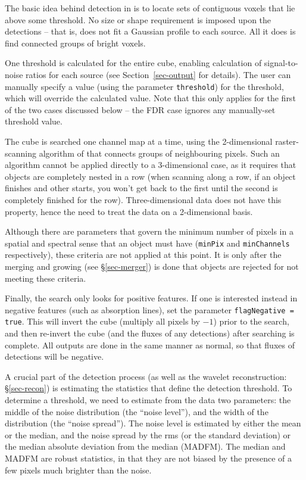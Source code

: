 \label{sec-detection}


The basic idea behind detection in \duchamp is to locate sets of
contiguous voxels that lie above some threshold. No size or shape
requirement is imposed upon the detections -- that is, \duchamp does
not fit \eg a Gaussian profile to each source. All it does is find
connected groups of bright voxels.

One threshold is calculated for the entire cube, enabling calculation
of signal-to-noise ratios for each source (see
Section~\ref{sec-output} for details). The user can manually specify a
value (using the parameter \texttt{threshold}) for the threshold,
which will override the calculated value. Note that this only applies
for the first of the two cases discussed below -- the FDR case ignores
any manually-set threshold value.

The cube is searched one channel map at a time, using the
2-dimensional raster-scanning algorithm of \citet{lutz80} that
connects groups of neighbouring pixels. Such an algorithm cannot be
applied directly to a 3-dimensional case, as it requires that objects
are completely nested in a row (when scanning along a row, if an
object finishes and other starts, you won't get back to the first
until the second is completely finished for the
row). Three-dimensional data does not have this property, hence the
need to treat the data on a 2-dimensional basis.

Although there are parameters that govern the minimum number of pixels
in a spatial and spectral sense that an object must have
(\texttt{minPix} and \texttt{minChannels} respectively), these
criteria are not applied at this point. It is only after the merging
and growing (see \S\ref{sec-merger}) is done that objects are rejected
for not meeting these criteria.

Finally, the search only looks for positive features. If one is
interested instead in negative features (such as absorption lines),
set the parameter \texttt{flagNegative = true}. This will invert the
cube (\ie multiply all pixels by $-1$) prior to the search, and then
re-invert the cube (and the fluxes of any detections) after searching
is complete. All outputs are done in the same manner as normal, so
that fluxes of detections will be negative.

\label{sec-stats}

A crucial part of the detection process (as well as the wavelet
reconstruction: \S\ref{sec-recon}) is estimating the statistics that
define the detection threshold. To determine a threshold, we need to
estimate from the data two parameters: the middle of the noise
distribution (the ``noise level''), and the width of the distribution
(the ``noise spread''). The noise level is estimated by either the
mean or the median, and the noise spread by the rms (or the standard
deviation) or the median absolute deviation from the median
(MADFM). The median and MADFM are robust statistics, in that they are
not biased by the presence of a few pixels much brighter than the
noise.

